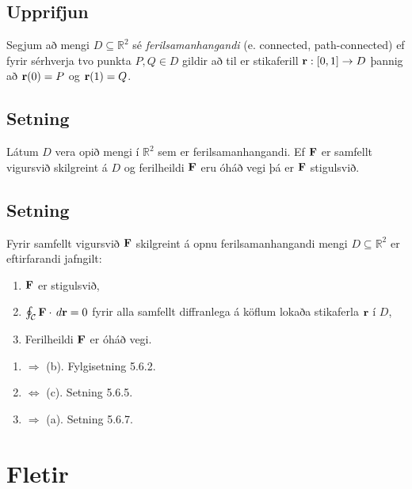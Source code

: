 \documentclass[a4paper,10pt,icelandic]{sphinxmanual}
\begin{document}
\subsection{Upprifjun}
\label{Kafli5:upprifjun}
Segjum að mengi \(D\subseteq {\mathbb  R}^2\) sé
\emph{ferilsamanhangandi} (e. connected, path-connected) ef fyrir sérhverja
tvo punkta \(P, Q\in D\) gildir að til er stikaferill
\(\mbox{${\bf r}$}:[0,1]\rightarrow D\) þannig að
\(\mbox{${\bf r}$}(0)=P\) og \(\mbox{${\bf r}$}(1)=Q\).


\subsection{Setning}
\label{Kafli5:id14}
Látum \(D\) vera opið mengi í \({\mathbb  R}^2\) sem er
ferilsamanhangandi. Ef \(\mbox{${\bf F}$}\) er samfellt vigursvið
skilgreint á \(D\) og ferilheildi \(\mbox{${\bf F}$}\) eru óháð
vegi þá er \(\mbox{${\bf F}$}\) stigulsvið.


\subsection{Setning}
\label{Kafli5:id15}
Fyrir samfellt vigursvið \(\mbox{${\bf F}$}\) skilgreint á opnu
ferilsamanhangandi mengi \(D\subseteq {\mathbb  R}^2\) er
eftirfarandi jafngilt:
\begin{enumerate}
\item {} 
\(\mbox{${\bf F}$}\) er stigulsvið,

\item {} 
\(\oint_{\cal C} \mbox{${\bf F}$}\cdot\,d\mbox{${\bf r}$}=0\) fyrir alla samfellt diffranlega á köflum lokaða stikaferla \(\mbox{${\bf r}$}\) í \(D\),

\item {} 
Ferilheildi \(\mbox{${\bf F}$}\) er óháð vegi.

\end{enumerate}
\begin{enumerate}
\item {} 
\(\Rightarrow\) (b). Fylgisetning 5.6.2.

\item {} 
\(\Leftrightarrow\) (c). Setning 5.6.5.

\item {} 
\(\Rightarrow\) (a). Setning 5.6.7.

\end{enumerate}


\section{Fletir}
\label{Kafli5:fletir}
\end{document}
